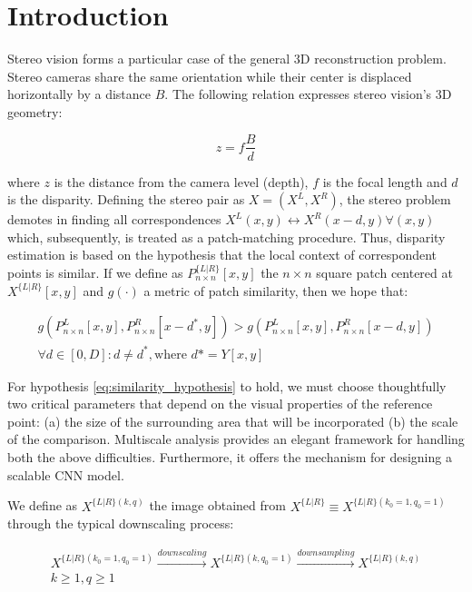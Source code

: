 \documentclass[runningheads]{llncs}
\begin{document}
\section{Introduction}

Stereo vision forms a particular case of the general 3D reconstruction problem. Stereo cameras share the same orientation while their center is displaced horizontally by a distance $B$. The following relation expresses stereo vision's 3D geometry:

\begin{equation} \label{eq:stereo_geometry}
z = f\frac{B}{d}
\end{equation}

where $z$ is the distance from the camera level (depth), $f$ is the focal length and $d$ is the disparity. Defining the stereo pair as $X = (X^L, X^R)$, the stereo problem demotes in finding all correspondences $X^L(x,y) \leftrightarrow X^R(x-d, y) \forall (x,y)$ which, subsequently, is treated as a patch-matching procedure. Thus, disparity estimation is based on the hypothesis that the local context of correspondent points is similar. If we define as $P^{ \{L|R\} }_{n \times n}[x,y]$ the  $n \times n$ square patch centered at $X^{ \{L|R\} }[x,y]$ and $g(\cdot)$ a metric of patch similarity, then we hope that:

\begin{equation}
\begin{gathered} \label{eq:similarity_hypothesis}
    g(P^L_{n \times n}[x,y], P^R_{n \times n}[x-d^*,y]) > g(P^L_{n \times n}[x,y], P^R_{n \times n}[x-d,y]) \\
    \forall d \in [0,D] : d \neq d^*, \text{where $d* = Y[x,y]$}
\end{gathered}
\end{equation}

For hypothesis \ref{eq:similarity_hypothesis} to hold, we must choose thoughtfully two critical parameters that depend on the visual properties of the reference point: (a) the size of the surrounding area that will be incorporated (b) the scale of the comparison. Multiscale analysis provides an elegant framework for handling both the above difficulties. Furthermore, it offers the mechanism for designing a scalable CNN model.

We define as $X^{ \{L|R\} (k,q)}$ the image obtained from $X^{ \{L|R\}} \equiv X^{ \{L|R\} (k_0=1,q_0=1)}$ through the typical downscaling process:

\begin{equation}
\begin{gathered} \label{eq:downsampling_procedure}
    X^{ \{L|R\} (k_0=1,q_0=1)} \xrightarrow{downscaling} 
    X^{ \{L|R\} (k,q_0=1)} \xrightarrow{downsampling} 
    X^{ \{L|R\} (k,q)}
    \\
    k\geq 1, q\geq 1 
\end{gathered}
\end{equation}
\end{document}
